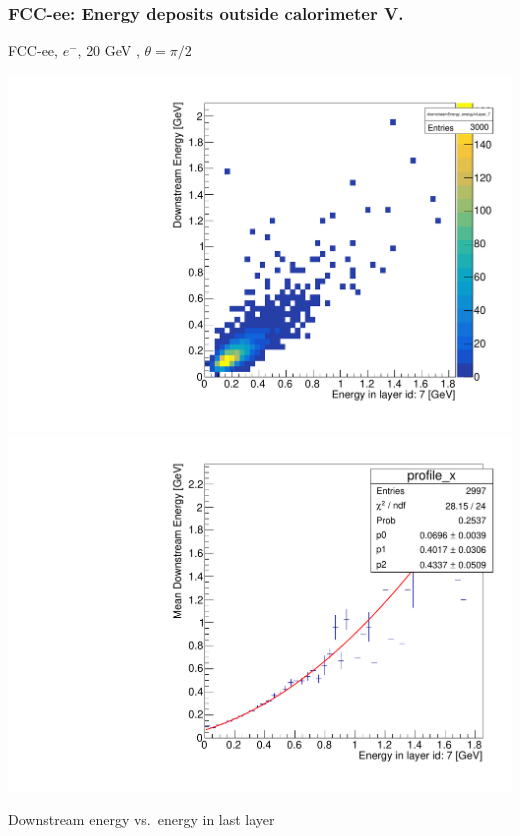 \documentclass{beamer}
\newcommand{\redtext}[1]{%
  \textcolor{myRed}{#1}
}
\begin{document}
\begin{frame}
  \frametitle{FCC-ee: Energy deposits outside calorimeter V.}

  \centering
  FCC-ee, $e^{-}$, \redtext{20 GeV}, $\theta = \pi/2$ \\[1.5ex]
  \begin{adjustwidth}{-9mm}{-9mm}
    \includegraphics[width=0.49\linewidth]{figures/downstream/hist_downstream_vs_layer_7_90deg_20GeV.pdf}
    \includegraphics[width=0.49\linewidth]{figures/downstream/profile_downstream_vs_layer_7_90deg_20GeV.pdf}
  \end{adjustwidth}
  \redtext{Downstream} energy vs.\ energy in last layer
\end{frame}
\end{document}
